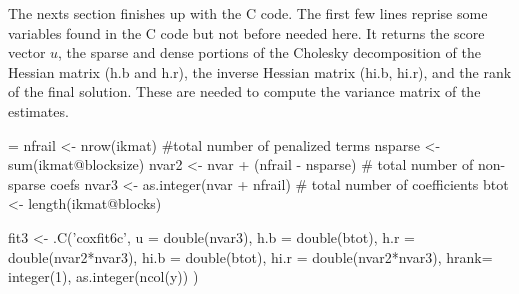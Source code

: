 \documentclass{article}
\begin{document}
The nexts section finishes up with the C code.
The first few lines reprise some variables
found in the C code but not before needed here.
It returns the score vector $u$, the 
sparse and dense portions of the Cholesky decomposition of the
Hessian matrix (h.b and h.r), the
inverse Hessian matrix (hi.b, hi.r), and the rank of the final 
solution.  These are needed to compute the variance matrix of the
estimates.
\begin{nwchunk}
=
 nfrail <- nrow(ikmat)  #total number of penalized terms
 nsparse <- sum(ikmat@blocksize)
 nvar2  <- nvar + (nfrail - nsparse)  # total number of non-sparse coefs
 nvar3  <- as.integer(nvar + nfrail)  # total number of coefficients
 btot   <- length(ikmat@blocks)
 
 fit3 <- .C('coxfit6c',
                u    = double(nvar3),
                h.b  = double(btot),
                h.r  = double(nvar2*nvar3),
                hi.b = double(btot),
                hi.r = double(nvar2*nvar3),
                hrank= integer(1),
                as.integer(ncol(y))
                )
\end{nwchunk}
\end{document}
